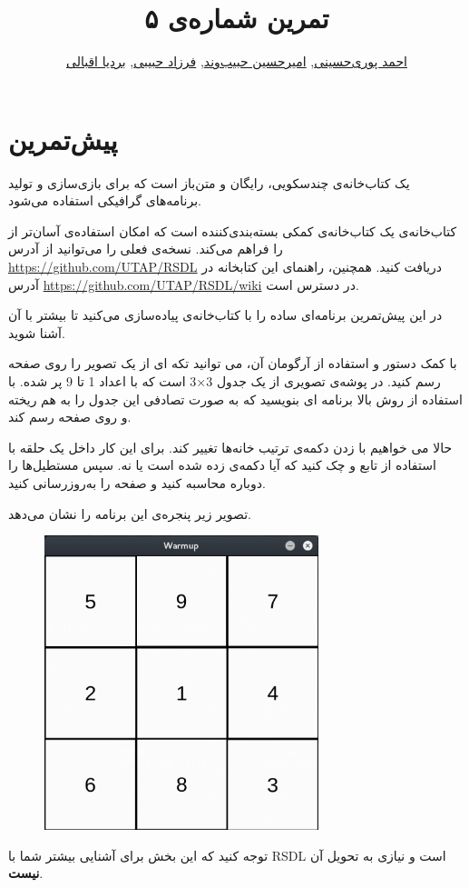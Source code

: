 \documentclass{utap}
\title{تمرین شماره‌ی ۵}
\author{
	\href{mailto:seyedahmadpourihosseini@gmail.com?subject=[AP\%20S98\%20A5]\%20}{احمد پوری‌حسینی},
	\href{mailto:ahhabibvand@gmail.com?subject=[AP\%20S98\%20A5]\%20}{امیرحسین حبیب‌وند},
	\href{mailto:farzadhabibii98@gmail.com?subject=[AP\%20S98\%20A5]\%20}{فرزاد حبیبی},
	\href{mailto:bardia.eghbali@gmail.com??subject=[AP\%20S98\%20A5]\%20}{بردیا اقبالی}
}
\begin{document}
	\maketitle

	\section{پیش‌تمرین }

  یک کتاب‌خانه‌ی چندسکویی، رایگان و متن‌باز است که برای بازی‌سازی و تولید برنامه‌های گرافیکی استفاده می‌شود.

کتاب‌خانه‌ی  یک کتاب‌خانه‌ی کمکی بسته‌بندی‌کننده است که امکان استفاده‌ی آسان‌تر از  را فراهم می‌کند.
نسخه‌ی فعلی  را می‌توانید از آدرس \url{https://github.com/UTAP/RSDL} دریافت کنید. همچنین، راهنمای این کتابخانه در آدرس \url{https://github.com/UTAP/RSDL/wiki} در دسترس است.

در این پیش‌تمرین برنامه‌ای ساده را با کتاب‌خانه‌ی  پیاده‌سازی می‌کنید تا بیشتر با آن آشنا شوید.


با کمک دستور  و استفاده از آرگومان  آن، می توانید تکه ای از یک تصویر را روی صفحه رسم کنید. در پوشه‌ی  تصویری از یک جدول 3×3 است که با اعداد 1 تا 9 پر شده. با استفاده از روش بالا برنامه ای بنویسید که به صورت تصادفی این جدول را به هم ریخته و روی صفحه رسم کند.

حالا می خواهیم با زدن دکمه‌ی  ترتیب خانه‌ها تغییر کند. برای این کار داخل یک حلقه با استفاده از تابع  و  چک کنید که آیا دکمه‌ی  زده شده است یا نه. سپس مستطیل‌ها را دوباره محاسبه کنید و صفحه را به‌روزرسانی کنید.

تصویر زیر پنجره‌ی این برنامه را نشان می‌دهد.
	\begin{figure}[H]
	\begin{center}
		\includegraphics[width=8cm]{warmup.png}
	\end{center}
	\end{figure}
توجه کنید که این بخش برای آشنایی بیشتر شما با RSDL است و نیازی به تحویل آن \textbf{نیست}.
\end{document}
